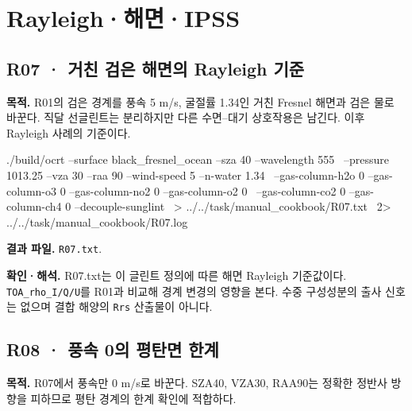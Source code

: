 \section{Rayleigh·해면·IPSS}
\label{sec:auto:09_cookbook:3}


\subsection{R07 · 거친 검은 해면의 Rayleigh 기준}
\label{sec:auto:09_cookbook:3.1}

\label{recipe:R07}

\textbf{목적. }R01의 검은 경계를 풍속 5 m/s, 굴절률 1.34인 거친 Fresnel 해면과 검은 물로 바꾼다. 직달 선글린트는 분리하지만 다른 수면–대기 상호작용은 남긴다. 이후 Rayleigh 사례의 기준이다.

\noindent\begin{minipage}{\linewidth}
\begin{ManualCode}

./build/ocrt --surface black_fresnel_ocean --sza 40 --wavelength 555 \
  --pressure 1013.25 --vza 30 --raa 90 --wind-speed 5 --n-water 1.34 \
  --gas-column-h2o 0 --gas-column-o3 0 --gas-column-no2 0 --gas-column-o2 0 \
  --gas-column-co2 0 --gas-column-ch4 0 --decouple-sunglint \
  > ../../task/manual_cookbook/R07.txt \
  2> ../../task/manual_cookbook/R07.log

\end{ManualCode}
\end{minipage}\par

\textbf{결과 파일. }\texttt{R07.txt}.

\textbf{확인·해석. }R07.txt는 이 글린트 정의에 따른 해면 Rayleigh 기준값이다. \texttt{TOA\_\allowbreak{}rho\_\allowbreak{}I/\allowbreak{}Q/\allowbreak{}U}를 R01과 비교해 경계 변경의 영향을 본다. 수중 구성성분의 출사 신호는 없으며 결합 해양의 \texttt{Rrs} 산출물이 아니다.


\subsection{R08 · 풍속 0의 평탄면 한계}
\label{sec:auto:09_cookbook:3.2}

\label{recipe:R08}

\textbf{목적. }R07에서 풍속만 0 m/s로 바꾼다. SZA40\textdegree{}, VZA30\textdegree{}, RAA90\textdegree{}는 정확한 정반사 방향을 피하므로 평탄 경계의 한계 확인에 적합하다.

